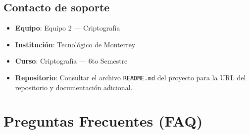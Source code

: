 \documentclass[10pt,letterpaper]{report}
\begin{document}
\section{Contacto de soporte}

\begin{itemize}[leftmargin=2cm]
  \item \textbf{Equipo}: Equipo 2 --- Criptografía
  \item \textbf{Institución}: Tecnológico de Monterrey
  \item \textbf{Curso}: Criptografía --- 6to Semestre
  \item \textbf{Repositorio}: Consultar el archivo \texttt{README.md} del proyecto para la URL del repositorio y documentación adicional.
\end{itemize}

\chapter{Preguntas Frecuentes (FAQ)}
\end{document}
